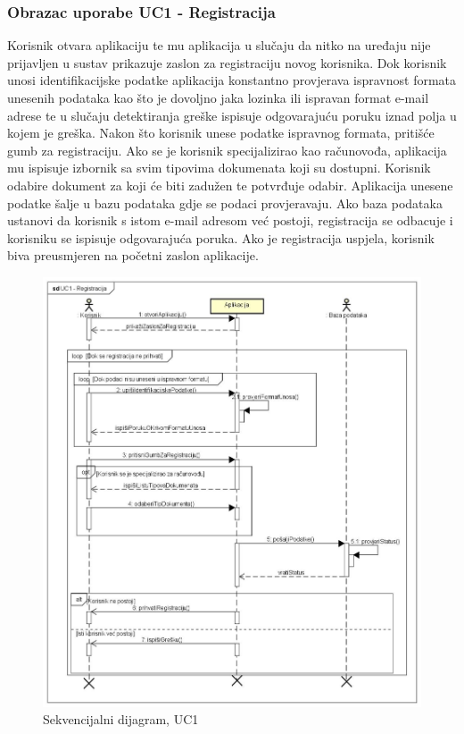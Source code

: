 				\subsubsection{Obrazac uporabe UC1 - Registracija}
				Korisnik otvara aplikaciju te mu aplikacija u slučaju da nitko na uređaju nije prijavljen u sustav prikazuje zaslon za registraciju novog korisnika. Dok korisnik unosi identifikacijske podatke aplikacija konstantno provjerava ispravnost formata unesenih podataka kao što je dovoljno jaka lozinka ili ispravan format e-mail adrese te u slučaju detektiranja greške ispisuje odgovarajuću poruku iznad polja u kojem je greška. Nakon što korisnik unese podatke ispravnog formata, pritišće gumb za registraciju. Ako se je korisnik specijalizirao kao računovođa, aplikacija mu ispisuje izbornik sa svim tipovima dokumenata koji su dostupni. Korisnik odabire dokument za koji će biti zadužen te potvrđuje odabir. Aplikacija unesene podatke šalje u bazu podataka gdje se podaci provjeravaju. Ako baza podataka ustanovi da korisnik s istom e-mail adresom već postoji, registracija se odbacuje i korisniku se ispisuje odgovarajuća poruka. Ako je registracija uspjela, korisnik biva preusmjeren na početni zaslon aplikacije.
				\begin{figure}[H]
					\includegraphics[scale=0.35]{slike/UC1 - Registracija} %
					\centering
					\caption{ Sekvencijalni dijagram, UC1}
					\label{fig:promjene}
				\end{figure}

